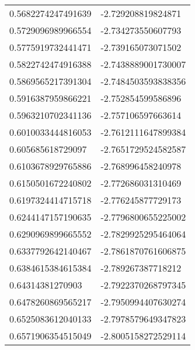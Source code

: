 \begin{supertabular}{ll}
0.5682274247491639  & -2.729208819824871   \\
0.5729096989966554  & -2.734273550607793   \\
0.5775919732441471  & -2.739165073071502   \\
0.5822742474916388  & -2.7438889001730007  \\
0.5869565217391304  & -2.7484503593838356  \\
0.5916387959866221  & -2.752854599586896   \\
0.5963210702341136  & -2.757106597663614   \\
0.6010033444816053  & -2.7612111647899384  \\
0.605685618729097   & -2.7651729524582587  \\
0.6103678929765886  & -2.768996458240978   \\
0.6150501672240802  & -2.772686031310469   \\
0.6197324414715718  & -2.776245877729173   \\
0.6244147157190635  & -2.7796800655225002  \\
0.6290969899665552  & -2.7829925295464064  \\
0.6337792642140467  & -2.7861870761606875  \\
0.6384615384615384  & -2.789267387718212   \\
0.64314381270903    & -2.7922370268797345  \\
0.6478260869565217  & -2.7950994407630274  \\
0.6525083612040133  & -2.7978579649347823  \\
0.6571906354515049  & -2.8005158272529114  \\
\end{supertabular}
